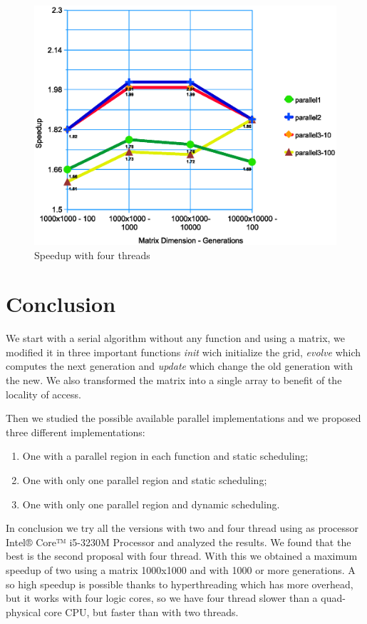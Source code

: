\documentclass[a4paper,11pt,twoside]{report}
\begin{document}
\begin{center}
\begin{figure}
	\centering
	\includegraphics[scale = 0.5]{4.eps}
	\caption{Speedup with four threads} \label{fig:9}
\end{figure}
\end{center}

\chapter{Conclusion}
We start with a serial algorithm without any function and using a matrix, we modified it in three important functions \emph{init} wich initialize the grid, \emph{evolve} which computes the next generation and \emph{update} which change the old generation with the new. We also transformed the matrix into a single array to benefit of the locality of access.

\noindent Then we studied the possible available parallel implementations and we proposed three different implementations: 
\begin{enumerate}
\item One with a parallel region in each function and static scheduling;
 \item One with only one parallel region and static scheduling;
 \item One with only one parallel region and dynamic scheduling.
\end{enumerate}
In conclusion we try all the versions with two and four thread using as processor Intel® Core™ i5-3230M Processor and analyzed the results. We found that the best is the second proposal with four thread. With this we obtained a maximum speedup of two using a matrix 1000x1000 and with 1000 or more generations. A so high speedup is possible thanks to hyperthreading which has more overhead, but it works with four logic cores, so we have four thread slower than a quad-physical core CPU, but faster than with two threads.   
\end{document}
